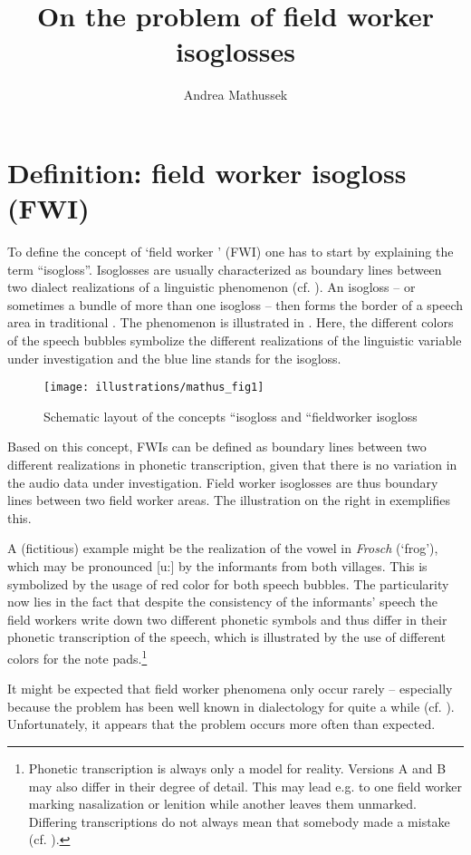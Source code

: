 \documentclass[output=paper]{LSP/langsci}
\author{Andrea Mathussek\affiliation{University of Freiburg}}
\title{On the problem of field worker isoglosses}
\begin{document}
\section{Definition: field worker isogloss (FWI)}
To define the concept of `field worker ' (FWI) one has to start by explaining the term ``isogloss''. Isoglosses are usually characterized as boundary lines between two dialect realizations of a linguistic phenomenon (cf. \citealt[296--297]{gluck_metzler_2005}). An isogloss – or sometimes a bundle of more than one isogloss – then forms the border of a speech area in traditional . The phenomenon is illustrated in . Here, the different colors of the speech bubbles symbolize the different realizations of the linguistic variable under investigation and the blue line stands for the isogloss.

\begin{figure}
\texttt{[image: illustrations/mathus\_fig1]}
\caption{Schematic layout of the concepts ``isogloss{\textquotedbl} and ``fieldworker isogloss{\textquotedbl}}
\label{fig:mathus:1}
\end{figure}

Based on this concept, FWIs can be defined as boundary lines between two different realizations in phonetic transcription, given that there is no variation in the audio data under investigation. Field worker isoglosses are thus boundary lines between two field worker areas. The illustration on the right in  exemplifies this.

A (fictitious) example might be the realization of the vowel in \textit{Frosch} (`frog'), which may be pronounced [u:] by the informants from both villages. This is symbolized by the usage of red color for both speech bubbles. The particularity now lies in the fact that despite the consistency of the informants' speech the field workers write down two different phonetic symbols and thus differ in their phonetic transcription of the speech, which is illustrated by the use of different colors for the note pads.\footnote{Phonetic transcription is always only a model for reality. Versions A and B may also differ in their degree of detail. This may lead e.g. to one field worker marking nasalization or lenition while another leaves them unmarked. Differing transcriptions do not always mean that somebody made a mistake (cf. \citealt[41--69]{mathussek_sprachraume_2014}).} 

It might be expected that field worker phenomena only occur rarely – especially because the problem has been well known in dialectology for quite a while (cf. \citealt[59--73]{hotzenkocherle_einfuhrung_1962}). Unfortunately, it appears that the problem occurs more often than expected.
\end{document}
